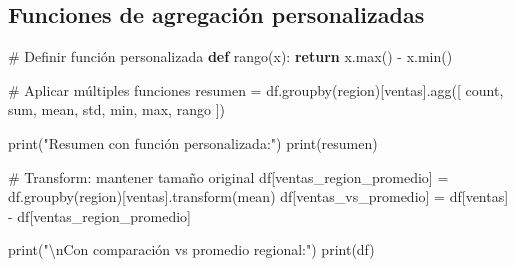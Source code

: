 \documentclass[
  doc,
  floatsintext,
  longtable,
  a4paper,
  nolmodern,
  notxfonts,
  notimes,
  12pt,
  colorlinks=true,linkcolor=blue,citecolor=blue,urlcolor=blue]{apa7}
\newenvironment{Shaded}{\begin{snugshade}}{\end{snugshade}}
\newcommand{\BuiltInTok}[1]{\textcolor[rgb]{0.00,0.23,0.31}{#1}}
\newcommand{\CharTok}[1]{\textcolor[rgb]{0.13,0.47,0.30}{#1}}
\newcommand{\CommentTok}[1]{\textcolor[rgb]{0.37,0.37,0.37}{#1}}
\newcommand{\ControlFlowTok}[1]{\textcolor[rgb]{0.00,0.23,0.31}{\textbf{#1}}}
\newcommand{\KeywordTok}[1]{\textcolor[rgb]{0.00,0.23,0.31}{\textbf{#1}}}
\newcommand{\NormalTok}[1]{\textcolor[rgb]{0.00,0.23,0.31}{#1}}
\newcommand{\OperatorTok}[1]{\textcolor[rgb]{0.37,0.37,0.37}{#1}}
\newcommand{\StringTok}[1]{\textcolor[rgb]{0.13,0.47,0.30}{#1}}
\begin{document}
\subsection{Funciones de agregación
personalizadas}\label{funciones-de-agregaciuxf3n-personalizadas}

\begin{Shaded}
\begin{Highlighting}[]
\CommentTok{\# Definir función personalizada}
\KeywordTok{def}\NormalTok{ rango(x):}
    \ControlFlowTok{return}\NormalTok{ x.}\BuiltInTok{max}\NormalTok{() }\OperatorTok{{-}}\NormalTok{ x.}\BuiltInTok{min}\NormalTok{()}

\CommentTok{\# Aplicar múltiples funciones}
\NormalTok{resumen }\OperatorTok{=}\NormalTok{ df.groupby(}\StringTok{\textquotesingle{}region\textquotesingle{}}\NormalTok{)[}\StringTok{\textquotesingle{}ventas\textquotesingle{}}\NormalTok{].agg([}
    \StringTok{\textquotesingle{}count\textquotesingle{}}\NormalTok{,}
    \StringTok{\textquotesingle{}sum\textquotesingle{}}\NormalTok{,}
    \StringTok{\textquotesingle{}mean\textquotesingle{}}\NormalTok{,}
    \StringTok{\textquotesingle{}std\textquotesingle{}}\NormalTok{,}
    \StringTok{\textquotesingle{}min\textquotesingle{}}\NormalTok{,}
    \StringTok{\textquotesingle{}max\textquotesingle{}}\NormalTok{,}
\NormalTok{    rango}
\NormalTok{])}

\BuiltInTok{print}\NormalTok{(}\StringTok{"Resumen con función personalizada:"}\NormalTok{)}
\BuiltInTok{print}\NormalTok{(resumen)}

\CommentTok{\# Transform: mantener tamaño original}
\NormalTok{df[}\StringTok{\textquotesingle{}ventas\_region\_promedio\textquotesingle{}}\NormalTok{] }\OperatorTok{=}\NormalTok{ df.groupby(}\StringTok{\textquotesingle{}region\textquotesingle{}}\NormalTok{)[}\StringTok{\textquotesingle{}ventas\textquotesingle{}}\NormalTok{].transform(}\StringTok{\textquotesingle{}mean\textquotesingle{}}\NormalTok{)}
\NormalTok{df[}\StringTok{\textquotesingle{}ventas\_vs\_promedio\textquotesingle{}}\NormalTok{] }\OperatorTok{=}\NormalTok{ df[}\StringTok{\textquotesingle{}ventas\textquotesingle{}}\NormalTok{] }\OperatorTok{{-}}\NormalTok{ df[}\StringTok{\textquotesingle{}ventas\_region\_promedio\textquotesingle{}}\NormalTok{]}

\BuiltInTok{print}\NormalTok{(}\StringTok{"}\CharTok{\textbackslash{}n}\StringTok{Con comparación vs promedio regional:"}\NormalTok{)}
\BuiltInTok{print}\NormalTok{(df)}
\end{Highlighting}
\end{Shaded}
\end{document}
